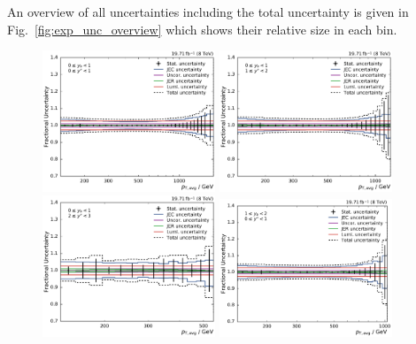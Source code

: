 An overview of all uncertainties including the total uncertainty is given in
Fig.~\ref{fig:exp_unc_overview} which shows their relative size in each bin.

\begin{figure}[htbp]
    \centering
    \includegraphics[width=0.46\textwidth]{figures/measurement/exp_unc_overview_yb0ys0.pdf}\hfill
    \includegraphics[width=0.46\textwidth]{figures/measurement/exp_unc_overview_yb0ys1.pdf}
    \includegraphics[width=0.46\textwidth]{figures/measurement/exp_unc_overview_yb0ys2.pdf}\hfill
    \includegraphics[width=0.46\textwidth]{figures/measurement/exp_unc_overview_yb1ys0.pdf}

\end{figure}
